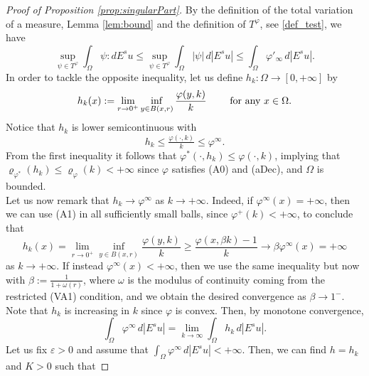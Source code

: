 \documentclass[a4paper,11pt,oneside,notitlepage]{article}
\numberwithin{equation}{section}
\newcommand{\e}{\varepsilon}
\newcommand{\vphi}{\varphi}
\newcommand{\vrho}{\varrho}
\begin{document}
\begin{proof}[Proof of Proposition \ref{prop:singularPart}]
    By the definition of the total variation of a measure, Lemma \ref{lem:bound} and the definition of $T^\vphi$, see \eqref{def_test}, we have
    \begin{equation*}
        \sup_{\psi \in T^\vphi} \int_\Omega \psi : dE^su 
        \le \sup_{\psi \in T^\vphi} \int_\Omega |\psi| \, d|E^su| 
        \le \int_\Omega \varphi'_\infty \, d|E^su|.
    \end{equation*}
    In order to tackle the opposite inequality, let us define $h_k : \Omega \to [0,+\infty]$ by
    \begin{equation*}
        h_k(x) := \lim_{r \to 0^+} \inf_{y \in B(x,r)} \frac{\vphi(y, k)}{k} \qquad \textnormal{ for any } x \in \Omega.
    \end{equation*}
    Notice that $h_k$ is lower semicontinuous with 
    \begin{equation}\label{leqhk}
    h_k \le \tfrac{\vphi(\cdot, k)}{k} \le \vphi^\infty.
    \end{equation}
    From the first inequality it follows that $\vphi^*(\cdot, h_k) \le \vphi(\cdot, k)$, implying that $\vrho_{\vphi^*}(h_k) \le \vrho_\vphi(k) < +\infty$ since $\vphi$ satisfies (A0) and (aDec), and $\Omega$ is bounded.
    \\
    Let us now remark that $h_k \to \vphi^\infty$ as $k \to +\infty$. Indeed, if $\vphi^\infty(x) = +\infty$, then we can use (A1) in all sufficiently small balls, since $\vphi^+(k) < +\infty$, to conclude that 
    \begin{equation}\label{geqhk}
        h_k(x) = \lim_{r \to 0^+} \inf_{y \in B(x,r)} \frac{\vphi(y, k)}{k} \ge \frac{\vphi(x, \beta k) - 1}{k} \to \beta \vphi^\infty(x) = +\infty
    \end{equation}
    as $k \to +\infty$. If instead $\vphi^\infty(x)< +\infty$, then we use the same inequality but now with $\beta := \tfrac{1}{1 + \omega(r)}$, where $\omega$ is the modulus of continuity coming from the restricted (VA1) condition, and we obtain the desired convergence as $\beta \to 1^-$. 
    \\
    Note that $h_k$ is increasing in $k$ since $\vphi$ is convex. Then, by monotone convergence,
    \begin{equation*}
        \int_\Omega \vphi^\infty \, d|E^su| = \lim_{k \to \infty} \int_\Omega h_k \, d|E^su|.
    \end{equation*}
    Let us fix $\e > 0$ and assume that $\int_\Omega \vphi^\infty \, d|E^su| < +\infty$. Then, we can find $h = h_k$ and $K > 0$ such that 

\end{proof}
\end{document}
